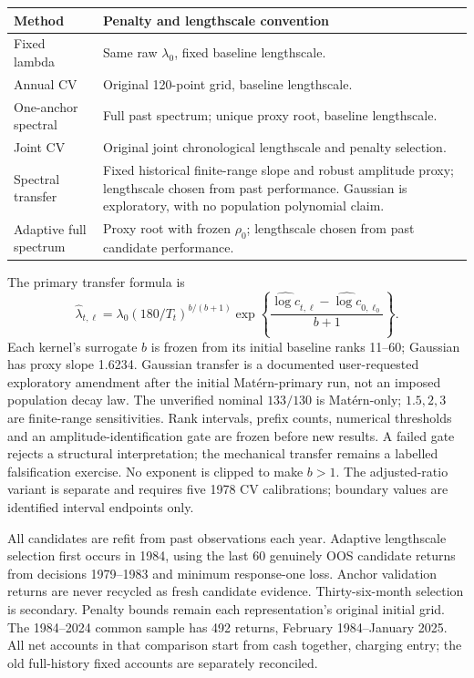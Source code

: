 \documentclass[11pt,letterpaper]{article}
\begin{document}
\begin{center}\small
\begin{tabular}{p{.23\linewidth}p{.68\linewidth}}
\toprule Method & Penalty and lengthscale convention\\\midrule
Fixed lambda & Same raw $\lambda_0$, fixed baseline lengthscale.\\
Annual CV & Original 120-point grid, baseline lengthscale.\\
One-anchor spectral & Full past spectrum; unique proxy root, baseline lengthscale.\\
Joint CV & Original joint chronological lengthscale and penalty selection.\\
Spectral transfer & Fixed historical finite-range slope and robust amplitude proxy; lengthscale chosen from past performance. Gaussian is exploratory, with no population polynomial claim.\\
Adaptive full spectrum & Proxy root with frozen $\rho_0$; lengthscale chosen from past candidate performance.\\\bottomrule
\end{tabular}
\end{center}
The primary transfer formula is
\[
 \widehat\lambda_{t,\ell}=\lambda_0(180/T_t)^{b/(b+1)}
 \exp\!\left\{\frac{\widehat{\log c}_{t,\ell}-\widehat{\log c}_{0,\ell_0}}{b+1}\right\}.
\]
Each kernel's surrogate $b$ is frozen from its initial baseline ranks 11--60;
Gaussian has proxy slope 1.6234. Gaussian transfer is a documented user-requested
exploratory amendment after the initial Mat\'ern-primary run, not an imposed
population decay law. The unverified nominal $133/130$ is Mat\'ern-only;
$1.5,2,3$ are finite-range sensitivities.
Rank intervals, prefix counts, numerical thresholds and an amplitude-identification
gate are frozen before new results. A failed gate rejects a structural interpretation;
the mechanical transfer remains a labelled falsification exercise. No exponent is
clipped to make $b>1$. The adjusted-ratio variant is separate and requires five
1978 CV calibrations; boundary values are identified interval endpoints only.

All candidates are refit from past observations each year. Adaptive lengthscale
selection first occurs in 1984, using the last 60 genuinely OOS candidate returns
from decisions 1979--1983 and minimum response-one loss. Anchor validation
returns are never recycled as fresh candidate evidence. Thirty-six-month selection
is secondary. Penalty bounds remain each representation's original initial grid.
The 1984--2024 common sample has 492 returns, February 1984--January 2025.
All net accounts in that comparison start from cash together, charging entry;
the old full-history fixed accounts are separately reconciled.
\end{document}
